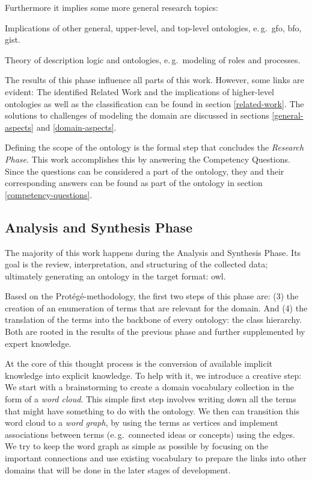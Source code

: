 \documentclass[a4paper, DIV=13, BCOR=0cm]{scrbook}
\newcommand{\eg}{e.\,g.\ }
\begin{document}
Furthermore it implies some more general research topics:
\begin{compactitem}
	\item Implications of other general, upper-level, and top-level ontologies, \eg \gls{gfo}, \gls{bfo}, \gls{gist}.
	\item Theory of description logic and ontologies, \eg modeling of roles and processes.
\end{compactitem}

The results of this phase influence all parts of this work. However, some links are evident: The identified Related Work and the implications of higher-level ontologies as well as the classification can be found in section \ref{related-work}. The solutions to challenges of modeling the domain are discussed in sections \ref{general-aspects} and \ref{domain-aspects}.

Defining the scope of the ontology is the formal step that concludes the \textit{Research Phase}. This work accomplishes this by answering the Competency Questions. Since the questions can be considered a part of the ontology, they and their corresponding answers can be found as part of the ontology in section \ref{competency-questions}.

\subsection{Analysis and Synthesis Phase }
\label{analysis}
The majority of this work happens during the Analysis and Synthesis Phase. Its goal is the review, interpretation, and structuring of the collected data; ultimately generating an ontology in the target format: \gls{owl}.

Based on the Protégé-methodology, the first two steps of this phase are: (3) the creation of an enumeration of terms that are relevant for the domain. And (4) the translation of the terms into the backbone of every ontology: the class hierarchy. Both are rooted in the results of the previous phase and further supplemented by expert knowledge.

At the core of this thought process is the conversion of available implicit knowledge into explicit knowledge. To help with it, we introduce a creative step: We start with a brainstorming to create a domain vocabulary collection in the form of a \textit{word cloud}. This simple first step involves writing down all the terms that might have something to do with the ontology. We then can transition this word cloud to a \textit{word graph}, by using the terms as vertices and implement associations between terms (\eg connected ideas or concepts) using the edges. We try to keep the word graph as simple as possible by focusing on the important connections and use existing vocabulary to prepare the links into other domains that will be done in the later stages of development.
\end{document}
